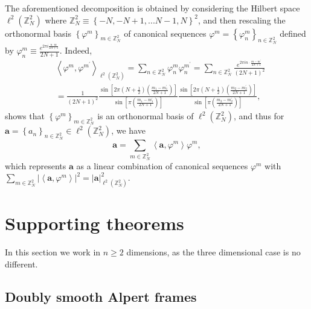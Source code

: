 \documentclass{amsart}%
\theoremstyle{plain}
\numberwithin{equation}{section}
\begin{document}
The aforementioned decomposition is obtained by considering the Hilbert space
$\ell^{2}\left(  \mathbb{Z}_{N}^{2}\right)  $ where $\mathbb{Z}_{N}^{2}%
\equiv\left\{  -N,-N+1,...N-1,N\right\}  ^{2}$, and then rescaling the
orthonormal basis $\left\{  \varphi^{m}\right\}  _{m\in\mathbb{Z}_{N}^{2}}$ of
canonical sequences $\varphi^{m}=\left\{  \varphi_{n}^{m}\right\}
_{n\in\mathbb{Z}_{N}^{2}}$ defined by $\varphi_{n}^{m}\equiv\frac{e^{2\pi
i\frac{n\cdot m}{2N+1}}}{2N+1}$. Indeed,
\begin{align*}
& \left\langle \varphi^{m},\varphi^{m^{\prime}}\right\rangle _{\ell^{2}\left(
\mathbb{Z}_{N}^{2}\right)  }=\sum_{n\in\mathbb{Z}_{N}^{2}}\varphi_{n}%
^{m}\varphi_{n}^{m^{\prime}}=\sum_{n\in\mathbb{Z}_{N}^{2}}\frac{e^{2\pi
in\cdot\frac{m-m^{\prime}}{2N+1}}}{\left(  2N+1\right)  ^{2}}\\
& =\frac{1}{\left(  2N+1\right)  ^{2}}\frac{\sin\left[  2\pi\left(  N+\frac
{1}{2}\right)  \left(  \frac{m_{1}-m_{1}^{\prime}}{2N+1}\right)  \right]
}{\sin\left[  \pi\left(  \frac{m_{1}-m_{1}^{\prime}}{2N+1}\right)  \right]
}\frac{\sin\left[  2\pi\left(  N+\frac{1}{2}\right)  \left(  \frac{m_{2}%
-m_{2}^{\prime}}{2N+1}\right)  \right]  }{\sin\left[  \pi\left(  \frac
{m_{2}-m_{2}^{\prime}}{2N+1}\right)  \right]  },
\end{align*}
shows that $\left\{  \varphi^{m}\right\}  _{m\in\mathbb{Z}_{N}^{2}}$ is an
orthonormal basis of $\ell^{2}\left(  \mathbb{Z}_{N}^{2}\right)  $, and thus
for $\mathbf{a}=\left\{  a_{n}\right\}  _{n\in\mathbb{Z}_{N}^{2}}\in\ell
^{2}\left(  \mathbb{Z}_{N}^{2}\right)  $, we have%
\begin{equation}
\mathbf{a}=\sum_{m\in\mathbb{Z}_{N}^{2}}\left\langle \mathbf{a},\varphi
^{m}\right\rangle \varphi^{m},\label{dec}%
\end{equation}
which represents $\mathbf{a}$ as a linear combination of canonical sequences
$\varphi^{m}$ with $\sum_{m\in\mathbb{Z}_{N}^{2}}\left\vert \left\langle
\mathbf{a},\varphi^{m}\right\rangle \right\vert ^{2}=\left\vert \mathbf{a}%
\right\vert _{\ell^{2}\left(  \mathbb{Z}_{N}^{2}\right)  }^{2}$.

\section{Supporting theorems}

In this section we work in $n\geq2$ dimensions, as the three dimensional case
is no different.

\subsection{Doubly smooth Alpert frames}
\end{document}

